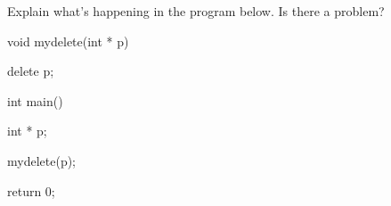 Explain what's happening in the program below. Is there a problem?



\begin{consolethree}[escapeinside=||]          

void mydelete(int * p)

{

    delete p;

}



int main()

{

    int * p;

    mydelete(p);

    return 0;

}

\end{consolethree}

